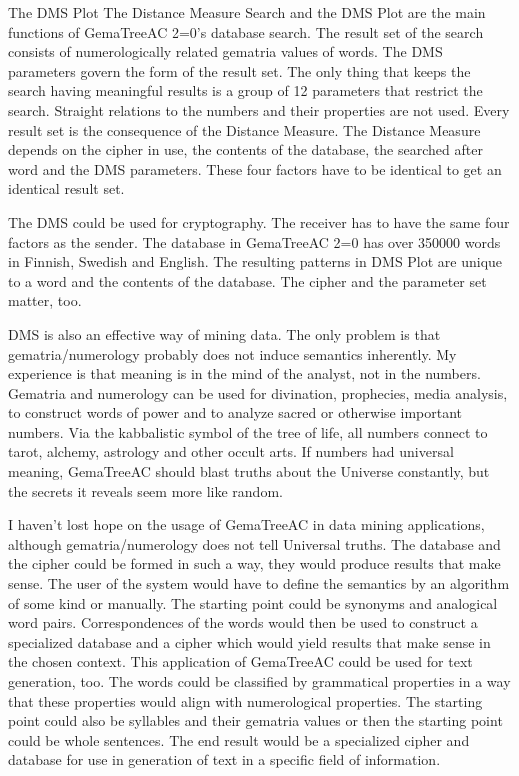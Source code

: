 \documentclass[a4paper,10pt]{article}
\begin{document}
   \begin{section}{The DMS Plot}
     The Distance Measure Search and the DMS Plot are the main functions of GemaTreeAC 2=0's database search.
     The result set of the search consists of numerologically related gematria values of words. The DMS parameters
     govern the form of the result set. The only thing that keeps the search having meaningful results is a group
     of 12 parameters that restrict the search. Straight relations to the numbers and their properties are not used.
     Every result set is the consequence of the Distance Measure. The Distance Measure depends on the cipher in use,
     the contents of the database, the searched after word and the DMS parameters. These four factors have to be identical
     to get an identical result set.

     The DMS could be used for cryptography. The receiver has to have the same four factors as the sender. The database in
     GemaTreeAC 2=0 has over 350000 words in Finnish, Swedish and English. The resulting patterns in DMS Plot are unique to
     a word and the contents of the database. The cipher and the parameter set matter, too.

     DMS is also an effective way of mining data. The only problem is that gematria/numerology probably
     does not induce semantics inherently. My experience is that meaning is in the mind of the analyst, not in the numbers.
     Gematria and numerology can be used for divination, prophecies, media analysis, to construct words of power and to
     analyze sacred or otherwise important numbers. Via the kabbalistic symbol of the tree of life, all numbers connect
     to tarot, alchemy, astrology and other occult arts. If numbers had universal meaning, GemaTreeAC should blast truths
     about the Universe constantly, but the secrets it reveals seem more like random.

     I haven't lost hope on the usage of GemaTreeAC in data mining applications, although gematria/numerology does not
     tell Universal truths. The database and the cipher could be formed in such a way, they would produce results that make
     sense. The user of the system would have to define the semantics by an algorithm of some kind or manually. The starting
     point could be synonyms and analogical word pairs. Correspondences of the words would then be used to construct a
     specialized database and a cipher which would yield results that make sense in the chosen context. This application
     of GemaTreeAC could be used for text generation, too. The words could be classified by grammatical properties in a
     way that these properties would align with numerological properties. The starting point could also be syllables and
     their gematria values or then the starting point could be whole sentences. The end result would be a specialized
     cipher and database for use in generation of text in a specific field of information.
     


\end{section}
\end{document}
